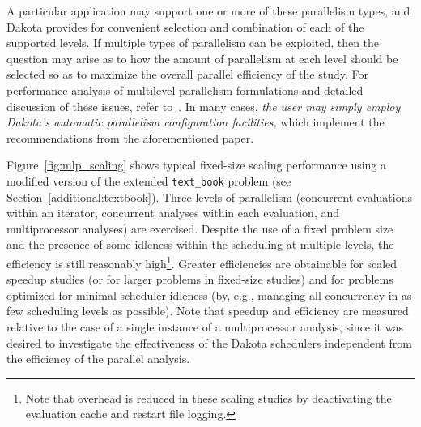 A particular application may support one or more of these parallelism
types, and Dakota provides for convenient selection and combination of
each of the supported levels. If multiple types of parallelism can be
exploited, then the question may arise as to how the amount of
parallelism at each level should be selected so as to maximize the
overall parallel efficiency of the study. For performance analysis of
multilevel parallelism formulations and detailed discussion of these
issues, refer to~\cite{Eld00}.  In many cases, \emph{the user may
simply employ Dakota's automatic parallelism configuration facilities,}
which implement the recommendations from the aforementioned paper.

Figure~\ref{fig:mlp_scaling} shows typical fixed-size scaling
performance using a modified version of the extended
\texttt{text\_book} problem (see Section~\ref{additional:textbook}).
Three levels of parallelism (concurrent evaluations within an
iterator, concurrent analyses within each evaluation, and
multiprocessor analyses) are exercised.  Despite the use of a fixed
problem size and the presence of some idleness within the scheduling
at multiple levels, the efficiency is still reasonably
high\footnote{Note that overhead is reduced in these scaling studies
by deactivating the evaluation cache and restart file logging.}.
Greater efficiencies are obtainable for scaled speedup studies (or for
larger problems in fixed-size studies) and for problems optimized for
minimal scheduler idleness (by, e.g., managing all concurrency in as
few scheduling levels as possible).  Note that speedup and efficiency
are measured relative to the case of a single instance of a
multiprocessor analysis, since it was desired to investigate the
effectiveness of the Dakota schedulers independent from the efficiency
of the parallel analysis.
